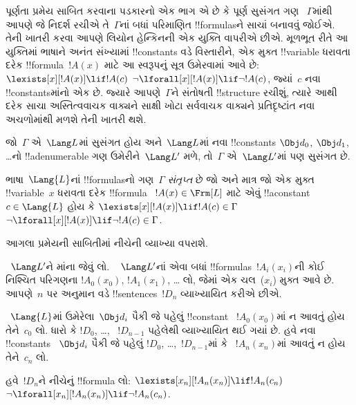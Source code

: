 \documentclass[../../../include/open-logic-section]{subfiles}
\begin{document}


\begin{explain}
પૂર્ણતા પ્રમેય સાબિત કરવાના પડકારનો એક ભાગ એ છે કે પૂર્ણ સુસંગત ગણ
~$\Gamma$માંથી આપણે જે નિદર્શ રચીએ તે~$\Gamma$નાં બધાં પરિમાણિત
!!{formula}sને સાચાં બનાવવું જોઈએ. તેની ખાતરી કરવા આપણે લિયોન હેન્કિનની
એક યુક્તિ વાપરીએ છીએ. મૂળભૂત રીતે આ યુક્તિમાં ભાષાને અનંત સંખ્યામાં
!!{constant}s વડે વિસ્તારીને, એક મુક્ત !!{variable} ધરાવતા દરેક
!!{formula}~$!A(x)$ માટે આ સ્વરૂપનું સૂત્ર ઉમેરવામાં આવે છે:
      {$\lexists[x][!A(x)] \lif !A(c)$}
      {$\lnot\lforall[x][!A(x)] \lif \lnot !A(c)$},
જ્યાં~$c$ નવા !!{constant}sમાંનો એક છે. જ્યારે આપણે~$\Gamma$ને
સંતોષતી !!{structure} રચીશું, ત્યારે આથી દરેક
{સાચા અસ્તિત્વવાચક વાક્યને સાક્ષી}
{ખોટા સર્વવાચક વાક્યને પ્રતિદૃષ્ટાંત}
નવા અચળોમાંથી મળશે તેની ખાતરી થશે.
\end{explain}

\begin{prop}
જો~$\Gamma$ એ~$\Lang L$માં સુસંગત હોય અને~$\Lang L$માં નવા
!!{constant}s $\Obj d_0$, $\Obj d_1$, \dots{}નો !!a{denumerable} ગણ
ઉમેરીને~$\Lang L'$ મળે, તો~$\Gamma$ એ~$\Lang L'$માં પણ સુસંગત છે.
\end{prop}

\begin{defn}[સંતૃપ્ત ગણ]
ભાષા~$\Lang {L}$નાં !!{formula}sનો ગણ~$\Gamma$ \emph{સંતૃપ્ત} છે જો
અને માત્ર જો એક મુક્ત !!{variable}~$x$ ધરાવતા દરેક !!{formula}
~$!A(x) \in \Frm[L]$ માટે એવું !!a{constant}~$c \in \Lang{L}$
હોય કે
      {$\lexists[x][!A(x)] \lif !A(c) \in \Gamma$}
      {$\lnot\lforall[x][!A(x)] \lif \lnot !A(c) \in \Gamma$}.
\end{defn}

આગલા પ્રમેયની સાબિતીમાં નીચેની વ્યાખ્યા વપરાશે.

\begin{defn}
~$\Lang L'$ને માંના જેવું લો. ~ $\Lang L'$નાં એવા
બધાં !!{formula}s~$!A_i(x_i)$ની કોઈ નિશ્ચિત પરિગણના
$!A_0(x_0)$, $!A_1(x_1)$, \dots{} લો, જેમાં એક ચલ~($x_i$) મુક્ત આવે
છે. આપણે~$n$ પર અનુમાન વડે !!{sentence}s~$!D_n$ વ્યાખ્યાયિત કરીએ છીએ.

~$\Lang{L}$માં ઉમેરેલા~$\Obj d_i$ પૈકી જે પહેલું !!{constant}
~$!A_0(x_0)$માં ન આવતું હોય તેને~$c_0$ લો. ધારો કે $!D_0$, \dots,
~$!D_{n-1}$ પહેલેથી વ્યાખ્યાયિત થઈ ગયાં છે. હવે નવા !!{constant}s
~$\Obj d_i$ પૈકી જે પહેલું $!D_0$, \dots,~$!D_{n-1}$માં કે
~$!A_n(x_n)$માં આવતું ન હોય તેને~$c_n$ લો.

હવે~$!D_{n}$ને નીચેનું !!{formula} લો:
{$\lexists[x_{n}][!A_{n}(x_{n})] \lif
  !A_{n}(c_{n})$}{$\lnot\lforall[x_{n}][!A_{n}(x_{n})] \lif \lnot
  !A_{n}(c_{n})$}.
\end{defn}
\end{document}
